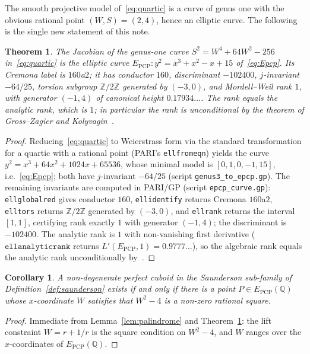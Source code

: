 \documentclass[11pt,reqno]{amsart}
\theoremstyle{plain}
\newtheorem{theorem}{Theorem}
\newtheorem{corollary}{Corollary}
\theoremstyle{definition}
\newcommand{\Q}{\mathbb{Q}}
\newcommand{\Z}{\mathbb{Z}}
\newcommand{\Epcp}{E_{\mathrm{PCP}}}
\begin{document}
The smooth projective model of~\eqref{eq:quartic} is a curve of genus one with
the obvious rational point $(W,S)=(2,4)$, hence an elliptic curve. The
following is the single new statement of this note.

\begin{theorem}\label{thm:main}
The Jacobian of the genus-one curve $S^2=W^4+64W^2-256$ in~\eqref{eq:quartic}
is the elliptic curve $\Epcp\colon y^2=x^3+x^2-x+15$ of~\eqref{eq:Epcp}. Its
Cremona label is $160$a$2$; it has conductor $160$, discriminant $-102400$,
$j$-invariant $-64/25$, torsion subgroup $\Z/2\Z$ generated by $(-3,0)$, and
Mordell--Weil rank $1$, with generator $(-1,4)$ of canonical height
$0.17934\ldots$. The rank equals the analytic rank, which is $1$; in particular
the rank is unconditional by the theorem of Gross--Zagier and
Kolyvagin~\cite{Kolyvagin}.
\end{theorem}

\begin{proof}
Reducing~\eqref{eq:quartic} to Weierstrass form via the standard transformation
for a quartic with a rational point (PARI's \texttt{ellfromeqn}) yields the curve
$y^2=x^3+64x^2+1024x+65536$, whose minimal model is $[0,1,0,-1,15]$, i.e.\
\eqref{eq:Epcp}; both have $j$-invariant $-64/25$ (script
\texttt{genus3\_to\_epcp.gp}). The remaining invariants are computed in PARI/GP
(script \texttt{epcp\_curve.gp}): \texttt{ellglobalred} gives conductor $160$,
\texttt{ellidentify} returns Cremona $160$a$2$, \texttt{elltors} returns
$\Z/2\Z$ generated by $(-3,0)$, and \texttt{ellrank} returns the interval
$[1,1]$, certifying rank exactly $1$ with generator $(-1,4)$; the discriminant
is $-102400$. The analytic rank is $1$ with non-vanishing first derivative
($\texttt{ellanalyticrank}$ returns $L'(\Epcp,1)=0.9777\ldots$), so the algebraic
rank equals the analytic rank unconditionally by~\cite{Kolyvagin}.
\end{proof}

\begin{corollary}\label{cor:locus}
A non-degenerate perfect cuboid in the Saunderson sub-family of
Definition~\ref{def:saunderson} exists if and only if there is a point
$P\in\Epcp(\Q)$ whose $x$-coordinate $W$ satisfies that $W^2-4$ is a non-zero
rational square.
\end{corollary}

\begin{proof}
Immediate from Lemma~\ref{lem:palindrome} and Theorem~\ref{thm:main}: the lift
constraint $W=r+1/r$ is the square condition on $W^2-4$, and $W$ ranges over the
$x$-coordinates of $\Epcp(\Q)$.
\end{proof}
\end{document}
